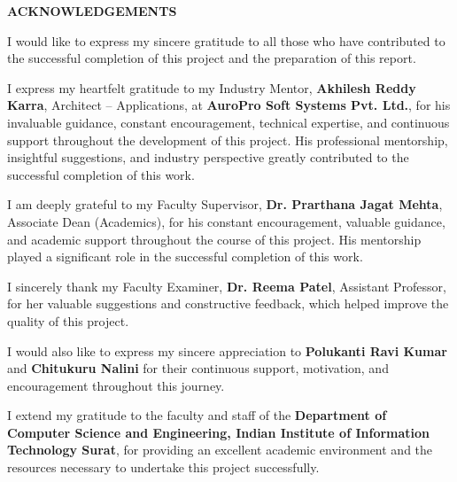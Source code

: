 \thispagestyle{plain}

\begin{center}
{\Large\bfseries\uppercase{Acknowledgements}}
\end{center}

\vspace{0.8cm}

I would like to express my sincere gratitude to all those who have contributed to the successful completion of this project and the preparation of this report.

\vspace{0.2cm}

I express my heartfelt gratitude to my Industry Mentor, \textbf{Akhilesh Reddy Karra}, Architect -- Applications, at \textbf{AuroPro Soft Systems Pvt. Ltd.}, for his invaluable guidance, constant encouragement, technical expertise, and continuous support throughout the development of this project. His professional mentorship, insightful suggestions, and industry perspective greatly contributed to the successful completion of this work.

\vspace{0.2cm}

I am deeply grateful to my Faculty Supervisor, \textbf{Dr. Prarthana Jagat Mehta}, Associate Dean (Academics), for his constant encouragement, valuable guidance, and academic support throughout the course of this project. His mentorship played a significant role in the successful completion of this work.

\vspace{0.2cm}

I sincerely thank my Faculty Examiner, \textbf{Dr. Reema Patel}, Assistant Professor, for her valuable suggestions and constructive feedback, which helped improve the quality of this project.

\vspace{0.2cm}

I would also like to express my sincere appreciation to \textbf{Polukanti Ravi Kumar} and \textbf{Chitukuru Nalini} for their continuous support, motivation, and encouragement throughout this journey.

\vspace{0.2cm}

I extend my gratitude to the faculty and staff of the \textbf{Department of Computer Science and Engineering, Indian Institute of Information Technology Surat}, for providing an excellent academic environment and the resources necessary to undertake this project successfully.

